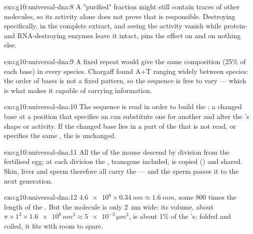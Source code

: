 \begin{solution}{exo:g10:universal-dna:8}
A "purified" fraction might still contain traces of other molecules,
so its activity alone does not prove that  is responsible.
Destroying  specifically, in the complete extract, and seeing the
activity vanish while protein- and RNA-destroying enzymes leave it
intact, pins the effect on  and on nothing else.
\end{solution}

\begin{solution}{exo:g10:universal-dna:9}
A fixed repeat would give the same composition (25\% of each base) in
every species. Chargaff found A+T ranging widely between species: the
order of bases is not a fixed pattern, so the sequence is free to
vary --- which is what makes it capable of carrying information.
\end{solution}

\begin{solution}{exo:g10:universal-dna:10}
The sequence is read in order to build the ; a changed base at
a position that specifies an  can substitute one 
for another and alter the 's shape or activity. If the changed
base lies in a part of the  that is not read, or specifies the
same , the  is unchanged.
\end{solution}

\begin{solution}{exo:g10:universal-dna:11}
All the  of the mouse descend by division from the fertilised
egg; at each division the , transgene included, is copied
() and shared. Skin, liver and sperm  therefore
all carry the  --- and the sperm passes it to the next generation.
\end{solution}

\begin{solution}{exo:g10:universal-dna:12}
$\num{4.6e6} \times \qty{0.34}{nm} \approx \qty{1.6}{mm}$, some 800
times the length of the . But the molecule is only \qty{2}{nm}
wide: its volume, about $\pi \times 1^2 \times \num{1.6e6}\,
\unit{nm^3} \approx \num{5e-3}\,\unit{\micro m^3}$, is about 1\% of the
's; folded and coiled, it fits with room to spare.
\end{solution}

